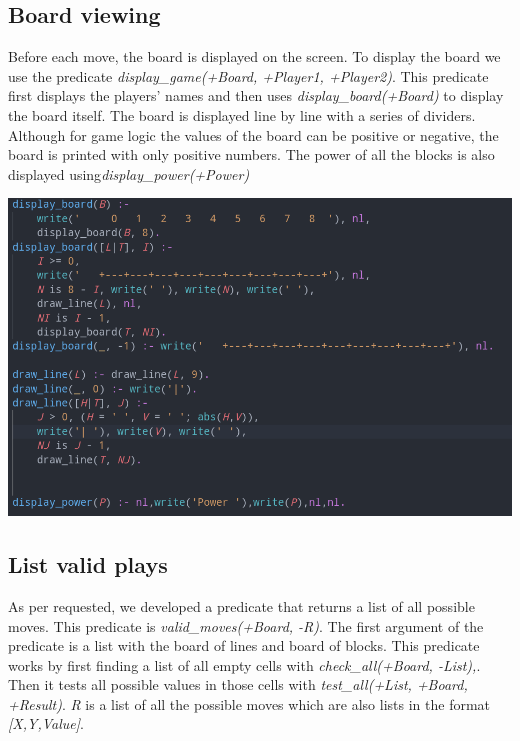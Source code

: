 \documentclass[a4paper]{article}
\begin{document}
\subsection{Board viewing} 
Before each move, the board is displayed on the screen. To display the board we use the predicate \textit{display\_game(+Board, +Player1, +Player2)}. This predicate first displays the players' names and then uses \textit{display\_board(+Board)} to display the board itself. 
The board is displayed line by line with a series of dividers. Although for game logic the values of the board can be positive or negative, the board is printed with only positive numbers.
The power of all the blocks is also displayed using\textit{display\_power(+Power)}

\begin{center}
    \includegraphics[scale=0.3]{img/display.png}
\end{center}


\subsection{List valid plays} 
As per requested, we developed a predicate that returns a list of all possible moves. This predicate is \textit{valid\_moves(+Board, -R)}. The first argument of the predicate is a list with the board of lines and board of blocks.
This predicate works by first finding a list of all empty cells with \textit{check\_all(+Board, -List),}. Then it tests all possible values in those cells with \textit{test\_all(+List, +Board, +Result)}.
\textit{R} is a list of all the possible moves which are also lists in the format \textit{[X,Y,Value]}.
\end{document}
